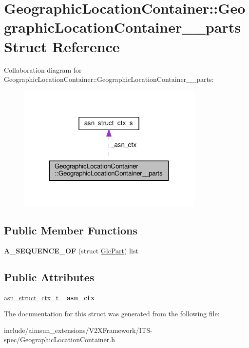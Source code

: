 \hypertarget{structGeographicLocationContainer_1_1GeographicLocationContainer____parts}{}\section{Geographic\+Location\+Container\+:\+:Geographic\+Location\+Container\+\_\+\+\_\+parts Struct Reference}
\label{structGeographicLocationContainer_1_1GeographicLocationContainer____parts}


Collaboration diagram for Geographic\+Location\+Container\+:\+:Geographic\+Location\+Container\+\_\+\+\_\+parts\+:\nopagebreak
\begin{figure}[H]
\begin{center}
\leavevmode
\includegraphics[width=263pt]{structGeographicLocationContainer_1_1GeographicLocationContainer____parts__coll__graph}
\end{center}
\end{figure}
\subsection*{Public Member Functions}
\begin{DoxyCompactItemize}
\item 
{\bfseries A\+\_\+\+S\+E\+Q\+U\+E\+N\+C\+E\+\_\+\+OF} (struct \hyperlink{structGlcPart}{Glc\+Part}) list\hypertarget{structGeographicLocationContainer_1_1GeographicLocationContainer____parts_a53e05c8797dfe6940350bdcf24b66a1b}{}\label{structGeographicLocationContainer_1_1GeographicLocationContainer____parts_a53e05c8797dfe6940350bdcf24b66a1b}

\end{DoxyCompactItemize}
\subsection*{Public Attributes}
\begin{DoxyCompactItemize}
\item 
\hyperlink{structasn__struct__ctx__s}{asn\+\_\+struct\+\_\+ctx\+\_\+t} {\bfseries \+\_\+asn\+\_\+ctx}\hypertarget{structGeographicLocationContainer_1_1GeographicLocationContainer____parts_ae57e8c9629ae06d6fd97d29db8b7104d}{}\label{structGeographicLocationContainer_1_1GeographicLocationContainer____parts_ae57e8c9629ae06d6fd97d29db8b7104d}

\end{DoxyCompactItemize}


The documentation for this struct was generated from the following file\+:\begin{DoxyCompactItemize}
\item 
include/aimsun\+\_\+extensions/\+V2\+X\+Framework/\+I\+T\+S-\/spec/Geographic\+Location\+Container.\+h\end{DoxyCompactItemize}
